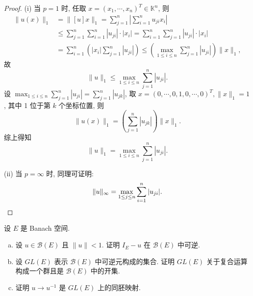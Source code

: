 \begin{proof}
(i) 当 $p=1$ 时, 任取 $x=(x_1,\cdots,x_n)^T\in\mathbb{K}^n$, 则
\[\begin{split}\|u(x)\|_1
&=\|[u]x\|_1=\sum_{j=1}^n\left|\sum_{i=1}^nu_{ji}x_i\right|\\
&\leq \sum_{j=1}^n\sum_{i=1}^n|u_{ji}|\cdot|x_i|=\sum_{i=1}^n\sum_{j=1}^n|u_{ji}|\cdot|x_i|\\
&=\sum_{i=1}^n\left(|x_i|\sum_{j=1}^n|u_{ji}|\right)\leq\left(\max\limits_{1\leq i\leq n}\sum_{j=1}^n|u_{ji}|\right)\|x\|_1,
\end{split}\]
故
\[\|u\|_1\leq \max\limits_{1\leq i\leq n}\sum_{j=1}^n|u_{ji}|.\]
设 $\max_{1\leq i\leq n}\sum_{j=1}^n|u_{ji}|=\sum_{j=1}^n|u_{jk}|$, 
取 $x=(0,\cdots,0,1,0,\cdots,0)^T,\|x\|_1=1$, 其中 1 位于第 $k$ 个坐标位置, 则
\[\|u(x)\|_1=\left(\sum_{j=1}^n|u_{jk}|\right)\|x\|_1.\]
综上得知
\[\|u\|_1=\max\limits_{1\leq i\leq n}\sum_{j=1}^n|u_{ji}|.\]

(ii) 当 $p=\infty$ 时, 同理可证明:
\[\|u\|_{\infty}=\max\limits_{1\leq j\leq n}\sum_{i=1}^n|u_{ji}|.\qedhere\]
\end{proof}




\begin{exercise}
    设 $E$ 是 Banach 空间.
    \begin{enumerate}[(a)]
    \item 设 $u\in\mathcal{B}(E)$ 且 $\|u\|<1$. 证明 $I_E-u$ 在 $\mathcal{B}(E)$ 中可逆.
    \item 设 $GL(E)$ 表示 $\mathcal{B}(E)$ 中可逆元构成的集合. 证明 $GL(E)$ 关于复合运算构成一个群且是 $\mathcal{B}(E)$ 中的开集.
    \item 证明 $u\to u^{-1}$ 是 $GL(E)$ 上的同胚映射.
    \end{enumerate}
\end{exercise}

